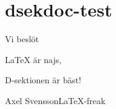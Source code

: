 \documentclass{dsekdoc}
\author{D-sektionen}
\begin{document}
\coverpage

\section*{\textsf{dsekdoc}-test}
\lipsum[1-2]

Vi beslöt
\begin{attlist}
\item \LaTeX{} är najs,
\item \lipsum[4]
\item D-sektionen är bäst!
\end{attlist}

\lipsum[5-7]

\signature{Lund, dag som ovan}{Axel Svensson}{\LaTeX-freak}
\end{document}
